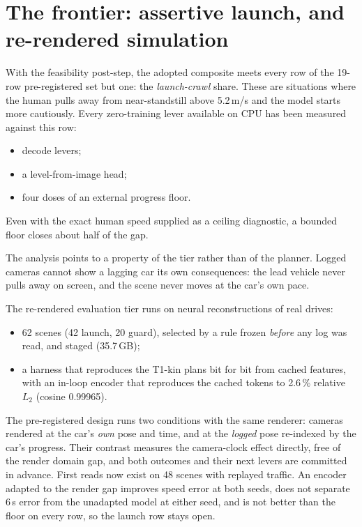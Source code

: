 \documentclass[10pt,twocolumn]{article}
\makeatletter
\theoremstyle{remark}
\renewcommand\paragraph{\@startsection{paragraph}{4}{\z@}{1.6ex \@plus .5ex \@minus .2ex}{-1em}{\normalfont\normalsize\bfseries}}
\makeatother
\begin{document}
\section{The frontier: assertive launch, and re-rendered simulation}\label{sec:frontier}
With the feasibility post-step, the adopted composite meets every row of the 19-row pre-registered set but one: the \emph{launch-crawl}
share. These are situations where the human pulls away from near-standstill above 5.2\,m/s and the model starts more cautiously.
Every zero-training lever available on CPU has been measured against this row:
\begin{itemize}
  \item decode levers;
  \item a level-from-image head;
  \item four doses of an external progress floor.
\end{itemize}
Even with the exact human speed supplied as a ceiling diagnostic, a bounded floor closes about half of the gap.

The analysis points to a property of the tier rather than of the planner. Logged cameras cannot show a lagging car its own
consequences: the lead vehicle never pulls away on screen, and the scene never moves at the car's own pace.

\paragraph{T2 re-perception.} The re-rendered evaluation tier runs on neural reconstructions of real drives:
\begin{itemize}
  \item 62 scenes (42 launch, 20 guard), selected by a rule frozen \emph{before} any log was read, and staged (35.7\,GB);
  \item a harness that reproduces the T1-kin plans bit for bit from cached features, with an in-loop encoder that reproduces the
        cached tokens to 2.6\,\% relative $L_2$ (cosine 0.99965).
\end{itemize}
The pre-registered design runs two conditions with the same renderer: cameras rendered at the car's \emph{own} pose and time, and at
the \emph{logged} pose re-indexed by the car's progress. Their contrast measures the camera-clock effect directly, free of the
render domain gap, and both outcomes and their next levers are committed in advance. First reads now exist on 48 scenes with replayed
traffic. An encoder adapted to the render gap improves speed error at both seeds, does not separate 6\,s error from the unadapted model at
either seed, and is not better than the floor on every row, so the launch row stays open.
\end{document}
